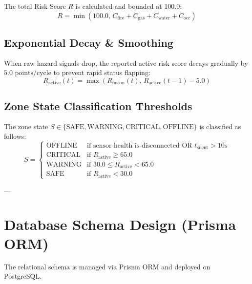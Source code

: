 \documentclass[11pt,a4paper]{article}
\begin{document}
The total Risk Score $R$ is calculated and bounded at $100.0$:
\begin{equation}
R = \min\left(100.0, \, C_{\text{fire}} + C_{\text{gas}} + C_{\text{water}} + C_{\text{occ}}\right)
\end{equation}

\subsection{Exponential Decay & Smoothing}
When raw hazard signals drop, the reported active risk score decays gradually by $5.0\text{ points/cycle}$ to prevent rapid status flapping:
\begin{equation}
R_{\text{active}}(t) = \max\left(R_{\text{fusion}}(t), \, R_{\text{active}}(t-1) - 5.0\right)
\end{equation}

\subsection{Zone State Classification Thresholds}
The zone state $S \in \{\text{SAFE}, \text{WARNING}, \text{CRITICAL}, \text{OFFLINE}\}$ is classified as follows:
\begin{equation}
S = \begin{cases}
\text{OFFLINE} & \text{if sensor health is disconnected OR } t_{\text{silent}} > 10\text{s} \\
\text{CRITICAL} & \text{if } R_{\text{active}} \ge 65.0 \\
\text{WARNING} & \text{if } 30.0 \le R_{\text{active}} < 65.0 \\
\text{SAFE} & \text{if } R_{\text{active}} < 30.0
\end{cases}
\end{equation}

---

\section{Database Schema Design (Prisma ORM)}

The relational schema is managed via Prisma ORM and deployed on PostgreSQL.
\end{document}
